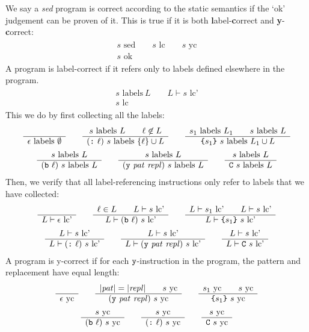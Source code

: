 \documentclass[11pt]{article}
\newcommand\RULE[2]{\begin{array}{c} #1 \\ \hline #2 \end{array}}
\newcommand\SED{\emph{sed}}
\newcommand\J[1]{\ensuremath{\text{ #1}}}
\newcommand\cmd[1]{\ensuremath{\text{\texttt{#1}}}}
\renewcommand\arg[1]{\ensuremath{\mathit{#1}}}
\begin{document}
We say a \SED{} program is correct according to the static semantics if the `ok' judgement can be proven of it.
This is true if it is both \textbf{l}abel-\textbf{c}orrect and \textbf{y}-\textbf{c}orrect:
\begin{gather*}
	\RULE{s \J{sed} \qquad s \J{lc} \qquad s \J{yc}}{s \J{ok}}
\end{gather*}
A program is label-correct if it refers only to labels defined elsewhere in the program.
\begin{gather*}
	\RULE{s \J{labels}\ L \qquad L \vdash s \J{lc'}}{s \J{lc}}
\end{gather*}
This we do by first collecting all the labels:
\begin{gather*}
	\RULE{}{\epsilon \J{labels}\ \emptyset} \qquad
	\RULE{s \J{labels}\ L \qquad \ell \not\in L}{(\cmd{:}\ \ell)\ s \J{labels}\ \{\ell\} \cup L} \qquad
	\RULE{s_1 \J{labels}\ L_1 \qquad s \J{labels}\ L}{\cmd{\{} s_1 \cmd{\}}\ s \J{labels}\ L_1 \cup L} \\
%
	\RULE{s \J{labels}\ L}{(\cmd{b}\ \ell)\ s \J{labels}\ L} \qquad
	\RULE{s \J{labels}\ L}{(\cmd{y}\ \arg{pat}\ \arg{repl})\ s \J{labels}\ L} \qquad
	\RULE{s \J{labels}\ L}{\cmd{C}\ s \J{labels}\ L}
\end{gather*}
Then, we verify that all label-referencing instructions only refer to labels that we have collected:
\begin{gather*}
	\RULE{}{L \vdash \epsilon \J{lc'}} \qquad
	\RULE{\ell \in L \qquad L \vdash s \J{lc'}}{L \vdash (\cmd{b}\ \ell)\ s \J{lc'}} \qquad
	\RULE{L \vdash s_1 \J{lc'} \qquad L \vdash s \J{lc'}}{L \vdash \cmd{\{} s_1 \cmd{\}}\ s \J{lc'}} \\
%
	\RULE{L \vdash s \J{lc'}}{L \vdash (\cmd{:}\ \ell)\ s \J{lc'}} \qquad
	\RULE{L \vdash s \J{lc'}}{L \vdash (\cmd{y}\ \arg{pat}\ \arg{repl})\ s \J{lc'}} \qquad
	\RULE{L \vdash s \J{lc'}}{L \vdash \cmd{C}\ s \J{lc'}}
\end{gather*}
A program is y-correct if for each \cmd{y}-instruction in the program, the pattern and replacement have equal length:
\begin{gather*}
	\RULE{}{\epsilon \J{yc}} \qquad
	\RULE{|\arg{pat}| = |\arg{repl}| \qquad s \J{yc}}{(\cmd{y}\ \arg{pat}\ \arg{repl})\ s \J{yc}} \qquad
	\RULE{s_1 \J{yc} \qquad s \J{yc}}{\cmd{\{} s_1 \cmd{\}}\ s \J{yc}} \\
%
	\RULE{s \J{yc}}{(\cmd{b}\ \ell)\ s \J{yc}} \qquad
	\RULE{s \J{yc}}{(\cmd{:}\ \ell)\ s \J{yc}} \qquad
	\RULE{s \J{yc}}{\cmd{C}\ s \J{yc}}
\end{gather*}
\end{document}
